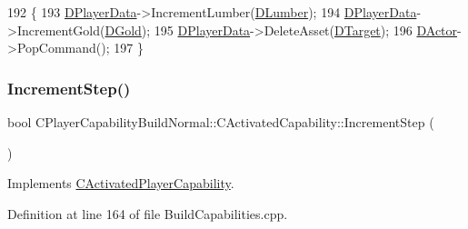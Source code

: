 \begin{DoxyCode}
192                                                              \{
193     \hyperlink{classCActivatedPlayerCapability_a9bf27c322a73f4b11c8183cc1973c3d8}{DPlayerData}->IncrementLumber(\hyperlink{classCPlayerCapabilityBuildNormal_1_1CActivatedCapability_acc7750973121c2b8ada035bca9264229}{DLumber});
194     \hyperlink{classCActivatedPlayerCapability_a9bf27c322a73f4b11c8183cc1973c3d8}{DPlayerData}->IncrementGold(\hyperlink{classCPlayerCapabilityBuildNormal_1_1CActivatedCapability_a8997bc10da71f5df340096cd0d717d84}{DGold});
195     \hyperlink{classCActivatedPlayerCapability_a9bf27c322a73f4b11c8183cc1973c3d8}{DPlayerData}->DeleteAsset(\hyperlink{classCActivatedPlayerCapability_a8a1cf50b6501bcfd55af0c935828e395}{DTarget});
196     \hyperlink{classCActivatedPlayerCapability_a54ca944b47bff2718330639941d402b0}{DActor}->PopCommand();
197 \}
\end{DoxyCode}
\hypertarget{classCPlayerCapabilityBuildNormal_1_1CActivatedCapability_a19b9ba979e8deebcb2b7e4225af47d2e}{}\label{classCPlayerCapabilityBuildNormal_1_1CActivatedCapability_a19b9ba979e8deebcb2b7e4225af47d2e} 
\subsubsection{\texorpdfstring{Increment\+Step()}{IncrementStep()}}
{\footnotesize\ttfamily bool C\+Player\+Capability\+Build\+Normal\+::\+C\+Activated\+Capability\+::\+Increment\+Step (\begin{DoxyParamCaption}{ }\end{DoxyParamCaption})\hspace{0.3cm}{\ttfamily [virtual]}}



Implements \hyperlink{classCActivatedPlayerCapability_a943b5999a57504399293250382c0ec6a}{C\+Activated\+Player\+Capability}.



Definition at line 164 of file Build\+Capabilities.\+cpp.


